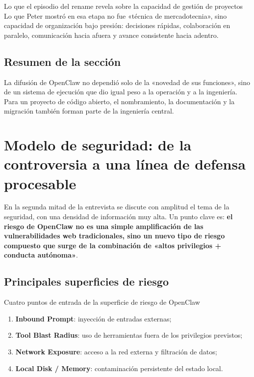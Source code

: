 \documentclass[a4paper]{article}
\begin{document}
\begin{importantbox}{Lo que el episodio del rename revela sobre la capacidad de gestión de proyectos}
Lo que Peter mostró en esa etapa no fue «técnica de mercadotecnia», sino capacidad de organización bajo presión: decisiones rápidas, colaboración en paralelo, comunicación hacia afuera y avance consistente hacia adentro.
\end{importantbox}

\subsection{Resumen de la sección}
La difusión de OpenClaw no dependió solo de la «novedad de sus funciones», sino de un sistema de ejecución que dio igual peso a la operación y a la ingeniería. Para un proyecto de código abierto, el nombramiento, la documentación y la migración también forman parte de la ingeniería central.
\section{Modelo de seguridad: de la controversia a una línea de defensa procesable}

En la segunda mitad de la entrevista se discute con amplitud el tema de la seguridad, con una densidad de información muy alta. Un punto clave es: \textbf{el riesgo de OpenClaw no es una simple amplificación de las vulnerabilidades web tradicionales, sino un nuevo tipo de riesgo compuesto que surge de la combinación de «altos privilegios + conducta autónoma»}.

\subsection{Principales superficies de riesgo}

\begin{warningbox}{Cuatro puntos de entrada de la superficie de riesgo de OpenClaw}
\begin{enumerate}
    \item \textbf{Inbound Prompt}: inyección de entradas externas;
    \item \textbf{Tool Blast Radius}: uso de herramientas fuera de los privilegios previstos;
    \item \textbf{Network Exposure}: acceso a la red externa y filtración de datos;
    \item \textbf{Local Disk / Memory}: contaminación persistente del estado local.
\end{enumerate}
\end{warningbox}
\end{document}
